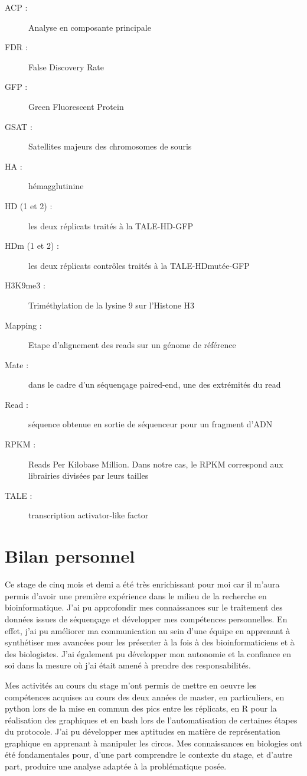 \documentclass[a4paper,12pt,times]{report}
\begin{document}
\begin{description} 

\item [ACP : ]  Analyse en composante principale
\item [FDR : ]  False Discovery Rate
\item [GFP :  ] Green Fluorescent Protein
\item [GSAT :  ] Satellites majeurs des chromosomes de souris
\item [HA :  ] hémagglutinine
\item [HD (1 et 2) : ] les deux réplicats traités à la TALE-HD-GFP
\item [HDm (1 et 2) : ]  les deux réplicats contrôles traités à la TALE-HDmutée-GFP
\item [H3K9me3 : ]  Triméthylation de la lysine 9 sur l'Histone H3
\item [Mapping : ] Etape d'alignement des reads sur un génome de référence
\item [Mate :  ] dans le cadre d'un séquençage paired-end, une des extrémités du read
\item [Read : ]  séquence obtenue en sortie de séquenceur pour un fragment d'ADN
\item [RPKM : ] Reads Per Kilobase Million. Dans notre cas, le RPKM correspond aux librairies divisées par leurs tailles
\item [TALE :  ] transcription activator-like factor

\end{description}

\newpage
\chapter*{{
\vspace*{-2cm}}Bilan personnel}
\setcounter{section}{0}
Ce stage de cinq mois et demi a été très enrichissant pour moi car il m’aura permis d’avoir une première expérience dans le milieu de la recherche en bioinformatique.
J’ai pu approfondir mes connaissances sur le traitement des données issues de séquençage et développer mes compétences personnelles. En effet, j'ai pu améliorer ma communication au sein d'une équipe en apprenant à synthétiser mes avancées pour les présenter à la fois à  des bioinformaticiens et  à des biologistes. J'ai également pu développer mon autonomie et la confiance en soi dans la mesure où j’ai était amené à prendre des responsabilités.

\bigskip
Mes activités au cours du stage m’ont permis de mettre en oeuvre les compétences acquises au cours des deux années de master, en particuliers, en python lors de la mise en commun des pics entre les réplicats, en R pour la réalisation des graphiques et en bash lors de l'automatisation de certaines étapes du protocole. J’ai  pu développer mes aptitudes en matière de représentation graphique en apprenant à manipuler les circos.
\newline
Mes connaissances en biologies ont été fondamentales pour, d’une part comprendre le contexte du stage, et d’autre part, produire une analyse adaptée à la problématique posée.
\end{document}
